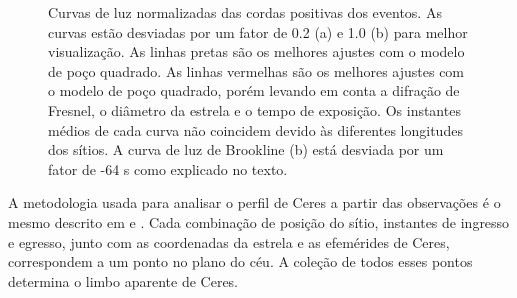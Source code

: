 \documentclass[12pt,a4paper]{monografia}
\begin{document}
\begin{figure}[h]
\begin{centering}
\caption{Curvas de luz normalizadas das cordas positivas dos eventos. As curvas estão desviadas por um fator de 0.2 (a) e 1.0 (b) para melhor visualização. As linhas pretas são os melhores ajustes com o modelo de poço quadrado. As linhas vermelhas são os melhores ajustes com o modelo de poço quadrado, porém levando em conta a difração de Fresnel, o diâmetro da estrela e o tempo de exposição. Os instantes médios de cada curva não coincidem devido às diferentes longitudes dos sítios. A curva de luz de Brookline (b) está desviada por um fator de -64 s como explicado no texto.
\label{Fig: Ceres-curves}}
\end{centering}
\end{figure}

A metodologia usada para analisar o perfil de Ceres a partir das observações é o mesmo descrito em \cite{Sicardy2011} e \cite{Braga-Ribas2013}. Cada combinação de posição do sítio, instantes de ingresso e egresso, junto com as coordenadas da estrela e as efemérides de Ceres, correspondem a um ponto no plano do céu. A coleção de todos esses pontos determina o limbo aparente de Ceres.
\end{document}
